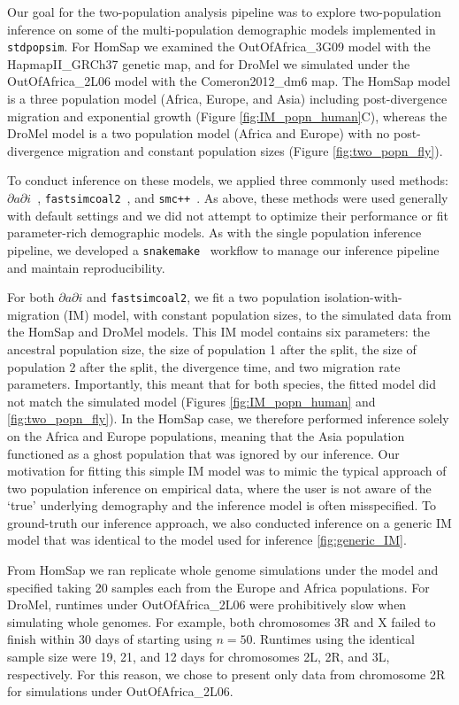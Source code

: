 \documentclass[12pt,halfline,a4paper]{ouparticle}
\newcommand{\stdpopsim}{\texttt{stdpopsim}\xspace}
\newcommand{\dadi}{$\partial a \partial i$\xspace}
\newcommand{\smcpp}{\texttt{smc++}\xspace}
\newcommand{\fastsimcoal}{\texttt{fastsimcoal2}\xspace}
\begin{document}
Our goal for the two-population analysis pipeline was to explore two-population inference
on some of the multi-population demographic models implemented in \stdpopsim.
For HomSap we examined the OutOfAfrica\_3G09 model with the HapmapII\_GRCh37 genetic map,
and for DroMel we simulated under the OutOfAfrica\_2L06 model with the Comeron2012\_dm6 map.
The HomSap model is a three population model (Africa, Europe, and Asia) including post-divergence
migration and exponential growth (Figure \ref{fig:IM_popn_human}C), whereas the
DroMel model is a two population model (Africa and Europe) with no post-divergence
migration and constant population sizes (Figure \ref{fig:two_popn_fly}).

To conduct inference on these models, we applied three commonly used methods:
\dadi~\citep{gutenkunst2009inferring}, \fastsimcoal~\citep{excoffier2013robust},
and \smcpp~\citep{terhorst2017robust}. As above, these methods were used
generally with default settings and we did not attempt to optimize their performance or fit
parameter-rich demographic models. As with the single population inference pipeline,
we developed a \texttt{snakemake}~\citep{koster2012snakemake} workflow to manage
our inference pipeline and maintain reproducibility.

For both \dadi and \fastsimcoal, we fit a two population
isolation-with-migration (IM) model, with constant population sizes, to the simulated
data from the HomSap and DroMel models. This IM model contains six parameters:
the ancestral population size, the size of population 1 after the split, the size of
population 2 after the split, the divergence time, and two migration rate parameters.
Importantly, this meant that for both species, the
fitted model did not match the simulated model (Figures \ref{fig:IM_popn_human} and \ref{fig:two_popn_fly}).
In the HomSap case, we therefore performed inference solely on the Africa
and Europe populations, meaning that the Asia population functioned as a ghost
population that was ignored by our inference. Our motivation for fitting this simple
IM model was to mimic the typical approach of two population inference on empirical
data, where the user is not aware of the `true' underlying demography and the inference
model is often misspecified. To ground-truth our inference approach, we also conducted
inference on a generic IM model that was identical to the model used for inference \ref{fig:generic_IM}.

From HomSap we ran replicate whole genome simulations under the model
and specified taking 20 samples each from the Europe and Africa populations.
For DroMel, runtimes under OutOfAfrica\_2L06 were prohibitively slow when simulating whole genomes.
For example, both chromosomes 3R and X failed to finish within 30 days of starting using $n = 50$.
Runtimes using the identical sample size were 19, 21, and 12 days for chromosomes 2L, 2R, and 3L,
respectively. For this reason, we chose to present only data from chromosome 2R for simulations
under OutOfAfrica\_2L06.
\end{document}

